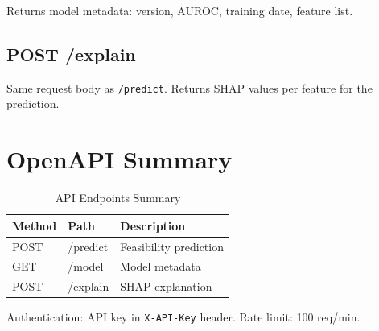 Returns model metadata: version, AUROC, training date, feature list.

\subsection{POST /explain}

Same request body as \texttt{/predict}. Returns SHAP values per feature for the prediction.

\section{OpenAPI Summary}

\begin{table}[htbp]
\centering
\caption{API Endpoints Summary}
\begin{tabular}{lll}
\toprule
Method & Path & Description \\
\midrule
POST & /predict & Feasibility prediction \\
GET & /model & Model metadata \\
POST & /explain & SHAP explanation \\
\bottomrule
\end{tabular}
\label{tab:api_endpoints}
\end{table}

Authentication: API key in \texttt{X-API-Key} header. Rate limit: 100 req/min.

